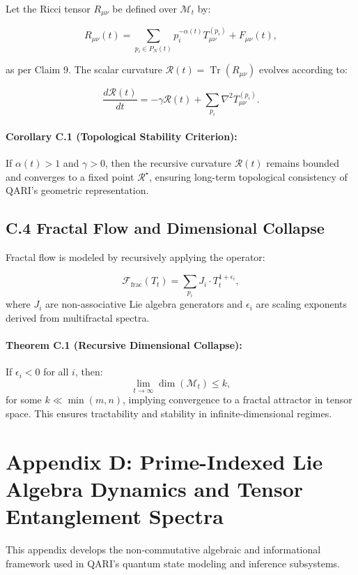 \documentclass[12pt]{article}
\begin{document}
\begin{itemize}
Let the Ricci tensor \(R_{\mu\nu}\) be defined over \(\mathcal{M}_t\) by:

\[
R_{\mu\nu}(t) = \sum_{p_i \in P_N(t)} p_i^{-\alpha(t)} T_{\mu\nu}^{(p_i)} + F_{\mu\nu}(t),
\]

as per Claim 9. The scalar curvature \(\mathcal{R}(t) = \operatorname{Tr}(R_{\mu\nu})\) evolves according to:

\[
\frac{d\mathcal{R}(t)}{dt} = - \gamma \mathcal{R}(t) + \sum_{p_i} \nabla^2 T_{\mu\nu}^{(p_i)}.
\]

\paragraph{Corollary C.1 (Topological Stability Criterion):}
If \(\alpha(t) > 1\) and \(\gamma > 0\), then the recursive curvature \(\mathcal{R}(t)\) remains bounded and converges to a fixed point \(\mathcal{R}^\star\), ensuring long-term topological consistency of QARI’s geometric representation.

\subsection*{C.4 Fractal Flow and Dimensional Collapse}

Fractal flow is modeled by recursively applying the operator:

\[
\mathcal{F}_{\text{frac}}(T_t) = \sum_{p_i} J_i \cdot T_t^{1 + \epsilon_i},
\]
where \(J_i\) are non-associative Lie algebra generators and \(\epsilon_i\) are scaling exponents derived from multifractal spectra.

\paragraph{Theorem C.1 (Recursive Dimensional Collapse):}
If \(\epsilon_i < 0\) for all \(i\), then:
\[
\lim_{t \to \infty} \dim(\mathcal{M}_t) \leq k,
\]
for some \(k \ll \min(m, n)\), implying convergence to a fractal attractor in tensor space. This ensures tractability and stability in infinite-dimensional regimes.


\section*{Appendix D: Prime-Indexed Lie Algebra Dynamics and Tensor Entanglement Spectra}

This appendix develops the non-commutative algebraic and informational framework used in QARI’s quantum state modeling and inference subsystems.


\end{itemize}
\end{document}
